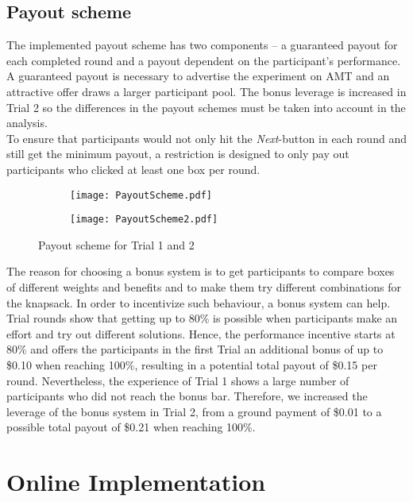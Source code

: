 \subsection{Payout scheme}
\label{ch:Experiment:sec:Interface:subsec:Payout scheme}
The implemented payout scheme has two components – a guaranteed payout for each completed round and a payout dependent on the participant’s performance. A guaranteed payout is necessary to advertise the experiment on \ac{AMT} and an attractive offer draws a larger participant pool. The bonus leverage is increased in Trial 2 so the differences in the payout schemes must be taken into account in the analysis.\\
To ensure that participants would not only hit the \textit{Next}-button in each round and still get the minimum payout, a restriction is designed to only pay out participants who clicked at least one box per round.
 \begin{figure}[htp] %
\begin{center}
\begin{subfigure} 
\centering
\texttt{[image: PayoutScheme.pdf]}
\end{subfigure}
\begin{subfigure} 
\centering
\texttt{[image: PayoutScheme2.pdf]}
\end{subfigure}
\caption{Payout scheme for Trial 1 and 2}
\label{fig:PayoutScheme}
\end{center}
\end{figure} 

The reason for choosing a bonus system is to get participants to compare boxes of different weights and benefits and to make  them try different combinations for the knapsack.
In order to incentivize such behaviour, a bonus system can help. Trial rounds show that getting up to 80\% is possible when participants make an effort and try out different solutions. Hence, the performance incentive starts at 80\% and offers the participants in the first Trial an additional bonus of up to \$0.10 when reaching 100\%, resulting in a potential total payout of \$0.15 per round. Nevertheless, the experience of Trial 1 shows a large number of participants who did not reach the bonus bar. Therefore, we increased the leverage of the bonus system in Trial 2, from a ground payment of \$0.01 to a possible total payout of \$0.21 when reaching 100\%.

\section{Online Implementation}
\label{ch:Experiment:sec:OnlineImplementation}


